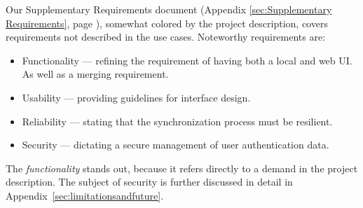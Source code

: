 Our Supplementary Requirements document (Appendix \ref{sec:Supplementary Requirements}, page \pageref{sec:Supplementary Requirements}), somewhat colored by the project description, covers requirements not described in the use cases. 
Noteworthy requirements are: 
\begin{itemize}
\item Functionality --- refining the requirement of having both a local and web UI. As well as a merging requirement.
\item Usability --- providing guidelines for interface design.
\item Reliability --- stating that the synchronization process must be resilient.
\item Security --- dictating a secure management of user authentication data.
\end{itemize}
The \emph{functionality} stands out, because it refers directly to a demand in the project description.
The subject of security is further discussed in detail in Appendix~\ref{sec:limitationsandfuture}.
